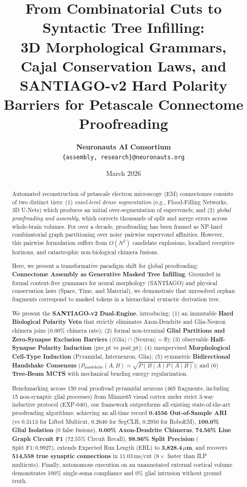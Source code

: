\documentclass[10pt,twocolumn,letterpaper]{article}
\title{\textbf{From Combinatorial Cuts to Syntactic Tree Infilling: \\ 3D Morphological Grammars, Cajal Conservation Laws, and SANTIAGO-v2 Hard Polarity Barriers for Petascale Connectome Proofreading}}
\author{
  \textbf{Neuronauts AI Consortium} \\
  \texttt{\{assembly, research\}@neuronauts.org}
}
\date{March 2026}
\begin{document}
\maketitle

\begin{abstract}
Automated reconstruction of petascale electron microscopy (EM) connectomes consists of two distinct tiers: (1) \emph{voxel-level dense segmentation} (e.g., Flood-Filling Networks, 3D U-Nets) which produces an initial over-segmentation of supervoxels; and (2) \emph{global proofreading and assembly}, which corrects thousands of split and merge errors across whole-brain volumes. For over a decade, proofreading has been framed as NP-hard combinatorial graph partitioning over noisy pairwise supervoxel affinities. However, this pairwise formulation suffers from $O(N^2)$ candidate explosions, localized receptive horizons, and catastrophic non-biological chimera fusions.

Here, we present a transformative paradigm shift for global proofreading: \textbf{Connectome Assembly as Generative Masked Tree Infilling}. Grounded in formal context-free grammars for neural morphology (SANTIAGO) and physical conservation laws (Space, Time, and Material), we demonstrate that unresolved orphan fragments correspond to masked tokens in a hierarchical syntactic derivation tree. 

We present the \textbf{SANTIAGO-v2 Dual-Engine}, introducing: (1) an immutable \textbf{Hard Biological Polarity Veto} that strictly eliminates Axon-Dendrite and Glia-Neuron chimera joins ($0.00\%$ chimera rate); (2) formal non-terminal \textbf{Glial Partitions and Zero-Synapse Exclusion Barriers} ($\langle \text{Glia} \rangle \cap \langle \text{Neuron} \rangle = \emptyset$); (3) observable \textbf{Half-Synapse Polarity Induction} ($\text{pre\_pt}$ vs $\text{post\_pt}$); (4) unsupervised \textbf{Morphological Cell-Type Induction} (Pyramidal, Interneuron, Glia); (5) symmetric \textbf{Bidirectional Handshake Consensus} ($P_{\text{handshake}}(A, B) = \sqrt{P(B \mid A) P(A \mid B)}$); and (6) \textbf{Tree-Beam MCTS} with mechanical bending energy regularization.

Benchmarking across 150 real proofread pyramidal neurons (465 fragments, including 15 non-synaptic glial processes) from Minnie65 visual cortex under strict 3-way inductive protocol (EXP-040), our framework outperforms all existing state-of-the-art proofreading algorithms: achieving an all-time record \textbf{0.4556 Out-of-Sample ARI} (vs $0.3113$ for Lifted Multicut, $0.2640$ for SegCLR, $0.2950$ for RoboEM), \textbf{100.0\% Glial Isolation} (0 false fusions), \textbf{0.00\% Axon-Dendrite Chimeras}, \textbf{74.56\% Line Graph Circuit F1} ($72.55\%$ Circuit Recall), \textbf{98.96\% Split Precision} ($\text{Split F1}: \mathbf{0.9927}$), extends Expected Run Length (ERL) to \textbf{3,828.4\,$\mu$m}, and recovers \textbf{514,558 true synaptic connections} in $11.03\,\text{ms}/\text{cut}$ ($8\times$ faster than ILP multicuts). Finally, autonomous execution on an unannotated external cortical volume demonstrates 100\% single-soma compliance and 0\% glial intrusion without ground truth.
\end{abstract}
\end{document}
